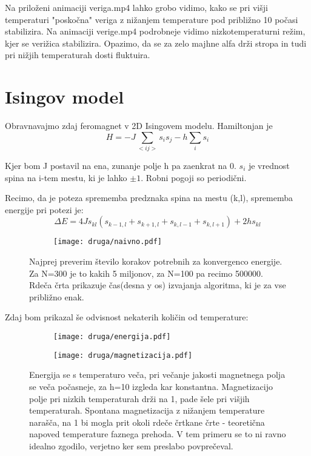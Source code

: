 \documentclass{article}
\begin{document}
Na priloženi animaciji veriga.mp4 lahko grobo vidimo, kako se pri višji temperaturi "poskočna" veriga z nižanjem temperature pod približno 10 počasi stabilizira. Na animaciji verige.mp4 podrobneje vidimo nizkotemperaturni režim, kjer se verižica stabilizira. Opazimo, da se za zelo majhne alfa drži stropa in tudi pri nižjih temperaturah dosti fluktuira.


\section{Isingov model}

Obravnavajmo zdaj feromagnet v 2D Isingovem modelu. Hamiltonjan je
\begin{equation*}
H = - J \sum_{<ij>} s_i s_j - h \sum_i s_i
\end{equation*}

Kjer bom J postavil na ena, zunanje polje h pa zaenkrat na 0. $s_i$ je vrednost spina na i-tem mestu, ki je lahko $\pm 1$. Robni pogoji so periodični.

Recimo, da je poteza sprememba predznaka spina na mestu (k,l), sprememba energije pri potezi je:
\begin{equation*}
\Delta E = 4Js_{kl} (s_{k-1,l} + s_{k+1,l} + s_{k,l-1} + s_{k,l+1}) + 2h s_{kl}
\end{equation*}

\begin{figure}[H]
\centering
\begin{subfigure}{.7\textwidth}
\texttt{[image: druga/naivno.pdf]}
\end{subfigure}
\caption*{Najprej preverim število korakov potrebnih za konvergenco energije. Za N=300 je to kakih 5 miljonov, za N=100 pa recimo 500000. Rdeča črta prikazuje čas(desna y os) izvajanja algoritma, ki je za vse približno enak.}
\end{figure}

Zdaj bom prikazal še odvisnost nekaterih količin od temperature:

\begin{figure}[H]
\centering
\begin{subfigure}{.49\textwidth}
\texttt{[image: druga/energija.pdf]}
\end{subfigure}
\begin{subfigure}{.49\textwidth}
\texttt{[image: druga/magnetizacija.pdf]}
\end{subfigure}
\caption*{Energija se s temperaturo veča, pri večanje jakosti magnetnega polja se veča počasneje, za h=10 izgleda kar konstantna. Magnetizacijo polje pri nizkih temperaturah drži na 1, pade šele pri višjih temperaturah. Spontana magnetizacija z nižanjem temperature narašča, na 1 bi mogla prit okoli rdeče črtkane črte - teoretična napoved temperature faznega prehoda. V tem primeru se to ni ravno idealno zgodilo, verjetno ker sem preslabo povprečeval.}
\end{figure}
\end{document}
